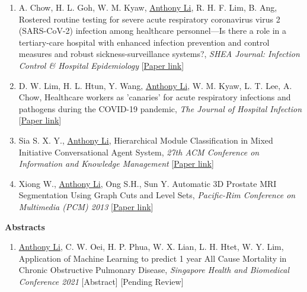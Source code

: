 \documentclass[letterpaper,10pt,oneside]{article}
\begin{document}
\begin{body}
\begin{enumerate}
\item A. Chow, H. L. Goh, W. M. Kyaw, \underline{Anthony Li}, R. H. F. Lim, B. Ang, \textcolor{mygray}{Rostered routine testing for severe acute respiratory coronavirus virus 2 (SARS-CoV-2) infection among healthcare personnel—Is there a role in a tertiary-care hospital with enhanced infection prevention and control measures and robust sickness-surveillance systems?}, \textit{SHEA Journal: Infection Control \& Hospital Epidemiology} [\href{https://www.cambridge.org/core/journals/infection-control-and-hospital-epidemiology/article/rostered-routine-testing-for-severe-acute-respiratory-coronavirus-virus-2-sarscov2-infection-among-healthcare-personnelis-there-a-role-in-a-tertiarycare-hospital-with-enhanced-infection-prevention-and-control-measures-and-robust-sicknesssurveillance-systems/30E175AEA1FBA0080DBB281D436D477B}{Paper link}]

\item D. W. Lim, H. L. Htun, Y. Wang, \underline{Anthony Li}, W. M. Kyaw, L. T. Lee, A. Chow, \textcolor{mygray}{Healthcare workers as 'canaries' for acute respiratory infections and pathogens during the COVID-19 pandemic}, \textit{The Journal of Hospital Infection} [\href{https://www.journalofhospitalinfection.com/article/S0195-6701(21)00140-7/fulltext}{Paper link}]

\item Sia S. X. Y., \underline{Anthony Li}, \textcolor{mygray}{Hierarchical Module Classification in Mixed Initiative Conversational Agent System}, \textit{27th ACM Conference on Information and Knowledge Management}
[\href{https://dl.acm.org/citation.cfm?id=3133185}{Paper link}]

\item Xiong W., \underline{Anthony Li}, Ong S.H., Sun Y. \textcolor{mygray}{Automatic 3D Prostate MRI Segmentation Using Graph Cuts and Level Sets}, \textit{Pacific-Rim Conference on Multimedia (PCM) 2013}
[\href{https://link.springer.com/chapter/10.1007/978-3-319-03731-8_20}{Paper link}]
\end{enumerate}

\textbf{Abstracts}
\GapNoBreak
{}

\begin{enumerate}

\item \underline{Anthony Li}, C. W. Oei, H. P. Phua, W. X. Lian, L. H. Htet, W. Y. Lim, \textcolor{mygray}{Application of Machine Learning to predict 1 year All Cause Mortality in Chronic Obstructive Pulmonary Disease}, \textit{Singapore Health and Biomedical Conference 2021} [Abstract] [Pending Review]


\end{enumerate}
\end{body}
\end{document}

